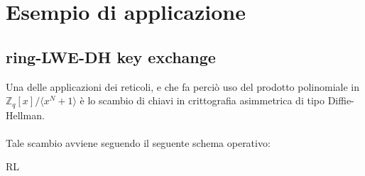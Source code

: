 \pagebreak
\section{Esempio di applicazione}
\subsection{ring-LWE-DH key exchange}
Una delle applicazioni dei reticoli, e che fa perciò uso del prodotto
polinomiale in $\mathbb{Z}_q[x]/\langle x^N+1 \rangle$ è lo scambio di chiavi
in crittografia asimmetrica di tipo Diffie-Hellman.\\
\\
Tale scambio avviene seguendo il seguente schema operativo:\\
\begin{tabular} {RL}
\end{tabular}
